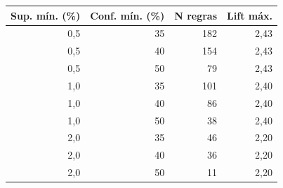 \begin{tabular}{@{}rrrr@{}}
\toprule
\textbf{Sup. m\'in. (\%)} & \textbf{Conf. m\'in. (\%)} & \textbf{N regras} & \textbf{Lift m\'ax.} \\
\midrule
0,5 & 35 & 182 & 2,43 \\
0,5 & 40 & 154 & 2,43 \\
0,5 & 50 & 79 & 2,43 \\
1,0 & 35 & 101 & 2,40 \\
1,0 & 40 & 86 & 2,40 \\
1,0 & 50 & 38 & 2,40 \\
2,0 & 35 & 46 & 2,20 \\
2,0 & 40 & 36 & 2,20 \\
2,0 & 50 & 11 & 2,20 \\
\bottomrule
\end{tabular}